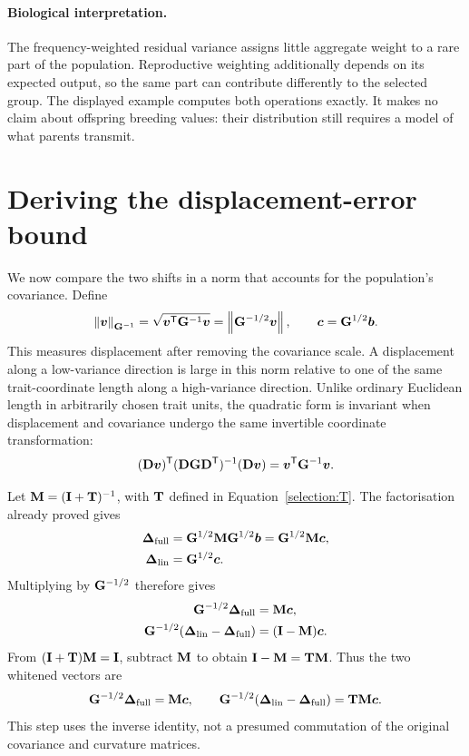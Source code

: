 \paragraph{Biological interpretation.}
The frequency-weighted residual variance assigns little aggregate weight
to a rare part of the population. Reproductive weighting additionally
depends on its expected output, so the same part can contribute
differently to the selected group. The displayed example computes both
operations exactly. It makes no claim about offspring breeding values:
their distribution still requires a model of what parents transmit.

\section{Deriving the displacement-error bound}
\label{selection:error_bound_section}

We now compare the two shifts in a norm that accounts for the population's
covariance. Define
\begin{equation}
\left\lVert \boldsymbol{v}\right\rVert_{\mathbf{G}^{-1}}
 =\sqrt{\boldsymbol{v}^{\mathsf T}\mathbf{G}^{-1}\boldsymbol{v}}
 =\left\lVert \mathbf{G}^{-1/2}\boldsymbol{v}\right\rVert,
\qquad \boldsymbol{c}=\mathbf{G}^{1/2}\boldsymbol{b}.
\label{selection:covariance_norm}
\end{equation}
This measures displacement after removing the covariance scale. A
displacement along a low-variance direction is large in this norm
relative to one of the same trait-coordinate length along a
high-variance direction. Unlike ordinary Euclidean length in arbitrarily
chosen trait units, the quadratic form is invariant when displacement
and covariance undergo the same invertible coordinate transformation:
\[
(\mathbf{D}\boldsymbol{v})^{\mathsf T}
 (\mathbf{D}\mathbf{G}\mathbf{D}^{\mathsf T})^{-1}
 (\mathbf{D}\boldsymbol{v})=\boldsymbol{v}^{\mathsf T}\mathbf{G}^{-1}\boldsymbol{v}.
\]

Let $\mathbf{M}=(\mathbf{I}+\mathbf{T})^{-1}$, with $\mathbf{T}$ defined in
Equation~\eqref{selection:T}. The factorisation already proved gives
\begin{align}
\boldsymbol{\Delta}_{\mathrm{full}}
 &=\mathbf{G}^{1/2}\mathbf{M}\mathbf{G}^{1/2}\boldsymbol{b}
   =\mathbf{G}^{1/2}\mathbf{M}\boldsymbol{c},\nonumber\\
\boldsymbol{\Delta}_{\mathrm{lin}}&=\mathbf{G}^{1/2}\boldsymbol{c}.
\end{align}
Multiplying by $\mathbf{G}^{-1/2}$ therefore gives
\begin{align}
\mathbf{G}^{-1/2}\boldsymbol{\Delta}_{\mathrm{full}}
 &=\mathbf{M}\boldsymbol{c},\nonumber\\
\mathbf{G}^{-1/2}
 (\boldsymbol{\Delta}_{\mathrm{lin}}-\boldsymbol{\Delta}_{\mathrm{full}})
 &=(\mathbf{I}-\mathbf{M})\boldsymbol{c}.
\end{align}
From $(\mathbf{I}+\mathbf{T})\mathbf{M}=\mathbf{I}$, subtract $\mathbf{M}$ to obtain
$\mathbf{I}-\mathbf{M}=\mathbf{T}\mathbf{M}$. Thus the two whitened vectors are
\begin{equation}
\mathbf{G}^{-1/2}\boldsymbol{\Delta}_{\mathrm{full}}=\mathbf{M}\boldsymbol{c},
\qquad
\mathbf{G}^{-1/2}(\boldsymbol{\Delta}_{\mathrm{lin}}-\boldsymbol{\Delta}_{\mathrm{full}})
 =\mathbf{T}\mathbf{M}\boldsymbol{c}.
\label{selection:whitened_error_identity}
\end{equation}
This step uses the inverse identity, not a presumed commutation of the
original covariance and curvature matrices.

